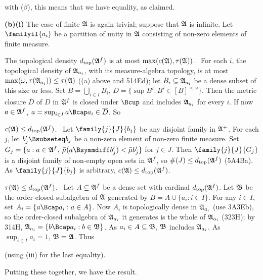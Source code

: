 {

\noindent with ($\beta$), this means that we have equality, as claimed.

\medskip

{\bf (b)(i)} The case of finite $\frak A$ is again trivial;  suppose that
$\frak A$ is infinite.   Let $\familyiI{a_i}$ be a partition of unity in
$\frak A$ consisting of non-zero elements of finite measure.

\medskip

 The topological density $d_{\text{top}}(\frak A^f)$
is at most $\max(c(\frak A),\tau(\frak A))$.
\Prf\ For each $i$, the topological density of $\frak A_{a_i}$, with its
measure-algebra topology, is at most
$\max(\omega,\tau(\frak A_{a_i}))\le\tau(\frak A)$ ((a) above and 514Ed);
let $B_i\subseteq\frak A_{a_i}$ be a dense subset of this size or less.
Set $B=\bigcup_{i\in I}B_i$, $D=\{\sup B':B'\in[B]^{<\omega}\}$.
Then the metric closure $\overline{D}$ of $D$ in $\frak A^f$ is closed
under $\Bcup$ and includes $\frak A_{a_i}$ for every $i$.   If now
$a\in\frak A^f$, $a=\sup_{i\in I}a\Bcap a_i\in\overline{D}$.   So


\medskip

 $c(\frak A)\le d_{\text{top}}(\frak A^f)$.   \Prf\ Let
$\family{j}{J}{b_j}$
be any disjoint family in $\frak A^+$.
For each $j$, let $b_j'\Bsubseteq b_j$ be a non-zero element of non-zero
finite measure.   Set
$G_j=\{a:a\in\frak A^f$, $\bar\mu(a\Bsymmdiff b'_j)<\bar\mu b'_j\}$ for
$j\in J$.   Then $\family{j}{J}{G_j}$ is a disjoint family of non-empty
open sets in $\frak A^f$, so $\#(J)\le d_{\text{top}}(\frak A^f)$ (5A4Ba).   As
$\family{j}{J}{b_j}$ is arbitrary,
$c(\frak A)\le d_{\text{top}}(\frak A^f)$.\ \Qed

\medskip

 $\tau(\frak A)\le d_{\text{top}}(\frak A^f)$.   \Prf\
Let $A\subseteq\frak A^f$ be a dense set with cardinal
$d_{\text{top}}(\frak A^f)$.  Let $\frak B$ be the order-closed
subalgebra of $\frak A$ generated by $B=A\cup\{a_i:i\in I\}$.   For any
$i\in I$, set
$A_i=\{a\Bcap a_i:a\in A\}$.   Now $A_i$ is topologically dense in
$\frak A_{a_i}$ (use 3A3Eb), so the order-closed subalgebra of
$\frak A_{a_i}$ it
generates is the whole of $\frak A_{a_i}$ (323H);  by 314H,
$\frak A_{a_i}=\{b\Bcap a_i:b\in\frak B\}$.   As
$a_i\in A\subseteq\frak B$, $\frak B$ includes $\frak A_{a_i}$.   As
$\sup_{i\in I}a_i=1$, $\frak B=\frak A$.   Thus


\noindent (using (iii) for the last equality).\ \Qed

\medskip

 Putting these together, we have the result.
}%

